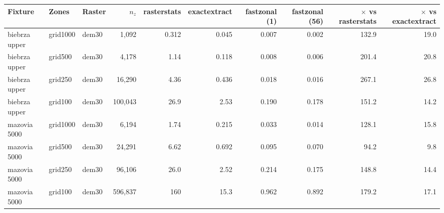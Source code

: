 \begin{tabular}{lllrrrrrrr}
\toprule
Fixture & Zones & Raster & $n_z$ & rasterstats & exactextract & fastzonal (1) & fastzonal (56) & $\times$ vs rasterstats & $\times$ vs exactextract \\
\midrule
biebrza upper & grid1000 & dem30 & 1,092 & 0.312 & 0.045 & 0.007 & 0.002 & 132.9 & 19.0 \\
biebrza upper & grid500 & dem30 & 4,178 & 1.14 & 0.118 & 0.008 & 0.006 & 201.4 & 20.8 \\
biebrza upper & grid250 & dem30 & 16,290 & 4.36 & 0.436 & 0.018 & 0.016 & 267.1 & 26.8 \\
biebrza upper & grid100 & dem30 & 100,043 & 26.9 & 2.53 & 0.190 & 0.178 & 151.2 & 14.2 \\
mazovia 5000 & grid1000 & dem30 & 6,194 & 1.74 & 0.215 & 0.033 & 0.014 & 128.1 & 15.8 \\
mazovia 5000 & grid500 & dem30 & 24,291 & 6.62 & 0.692 & 0.095 & 0.070 & 94.2 & 9.8 \\
mazovia 5000 & grid250 & dem30 & 96,106 & 26.0 & 2.52 & 0.214 & 0.175 & 148.8 & 14.4 \\
mazovia 5000 & grid100 & dem30 & 596,837 & 160 & 15.3 & 0.962 & 0.892 & 179.2 & 17.1 \\
\bottomrule
\end{tabular}
